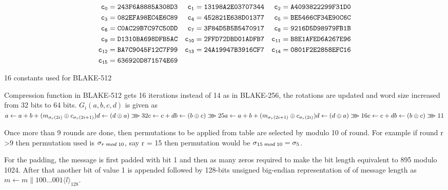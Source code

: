   \begin{table}
    \begin{align*}
         {\tt c_{0}}  &= {\tt 243F6A8885A308D3} & {\tt c_{1}}  &= {\tt 13198A2E03707344} & {\tt c_{2}}  &= {\tt A4093822299F31D0} 
      \\ {\tt c_{3}}  &= {\tt 082EFA98EC4E6C89} & {\tt c_{4}}  &= {\tt 452821E638D01377} & {\tt c_{5}}  &= {\tt BE5466CF34E90C6C} 
      \\ {\tt c_{6}}  &= {\tt C0AC29B7C97C50DD} & {\tt c_{7}}  &= {\tt 3F84D5B5B5470917} & {\tt c_{8}}  &= {\tt 9216D5D98979FB1B} 
      \\ {\tt c_{9}}  &= {\tt D1310BA698DFB5AC} & {\tt c_{10}} &= {\tt 2FFD72DBD01ADFB7} & {\tt c_{11}} &= {\tt B8E1AFED6A267E96} 
      \\ {\tt c_{12}} &= {\tt BA7C9045F12C7F99} & {\tt c_{13}} &= {\tt 24A19947B3916CF7} & {\tt c_{14}} &= {\tt 0801F2E2858EFC16} 
      \\ {\tt c_{15}} &= {\tt 636920D871574E69} &                                        &      
    \end{align*}
    \caption{16 constants used for BLAKE-512 \cite{00002}}
  \end{table}
  
  Compression function in BLAKE-512 gets 16 iterations instead of 14 as in BLAKE-256, the rotations are updated and 
  word size increased from 32 bits to 64 bits. $G_{i}(a, b, c, d)$ is given as \\
  $
  a \gets a + b + (m_{\sigma_{r}(2i)} \oplus c_{\sigma_{r}(2i + 1)}) \\
  d \gets (d \oplus a) \ggg 32 \\
  c \gets c + d \\
  b \gets (b \oplus c) \ggg 25 \\
  a \gets a + b + (m_{\sigma_{r}(2i + 1)} \oplus c_{\sigma_{r}(2i)}) \\
  d \gets (d \oplus a) \ggg 16 \\
  c \gets c + d \\
  b \gets (b \oplus c) \ggg 11
  $
  
  Once more than 9 rounds are done, then permutations to be applied from table are selected by modulo 10 of round. 
  For example if round r \textgreater 9 then permutation used is $\sigma_{r \thickspace mod \thickspace 10}$, say 
  r = 15 then permutation would be $\sigma_{15 \thickspace mod \thickspace 10} = \sigma_{5}$.

  For the padding, the message is first padded with bit 1 and then as many zeros required to make the bit length
  equivalent to 895 modulo 1024. After that another bit of value 1 is appended followed by 128-bits unsigned big-endian
  representation of of message length as $m \gets m \parallel 100 \dots 001 \langle l \rangle_{128}$.

